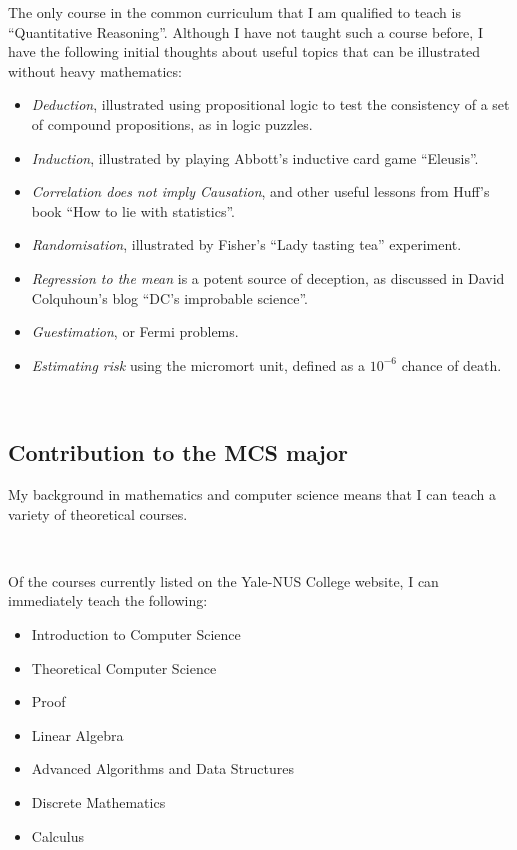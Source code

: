 \documentclass[10,a4paper,sans]{moderncv}
\begin{document}
The only course in the common curriculum that I am qualified to teach is ``Quantitative Reasoning''. Although I have not taught such a course before, I have the following initial thoughts about useful topics that can be illustrated without heavy mathematics:
\begin{itemize}
 \item \emph{Deduction}, illustrated using propositional logic to test the consistency of a set of compound propositions, as in logic puzzles.
 \item \emph{Induction}, illustrated by playing Abbott's inductive card game ``Eleusis''.
 \item \emph{Correlation does not imply Causation}, and other useful lessons from Huff's book ``How to lie with statistics''.
 \item \emph{Randomisation}, illustrated by Fisher's ``Lady tasting tea'' experiment.
 \item \emph{Regression to the mean} is a potent source of deception, as discussed in David Colquhoun's blog ``DC's improbable science''.
 \item \emph{Guestimation}, or Fermi problems.
 \item \emph{Estimating risk} using the micromort unit, defined as a $10^{-6}$ chance of death.
 \end{itemize}


\



\subsection{Contribution to the MCS major}

My background in mathematics and computer science means that I can teach a variety of theoretical courses.

\

Of the courses currently listed on the Yale-NUS College website, 
I can immediately teach the following:

\begin{itemize}
\item Introduction to Computer Science %
\item Theoretical Computer Science
\item Proof %
\item Linear Algebra %
\item Advanced Algorithms and Data Structures
\item Discrete Mathematics
\item Calculus
\end{itemize}
\end{document}
